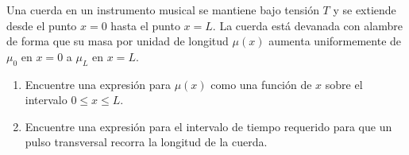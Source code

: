\item Una cuerda en un instrumento musical se mantiene bajo tensión $T$ y se extiende desde el punto $x = 0$ hasta el punto $x = L$. La cuerda está devanada con alambre de forma que su masa por unidad de longitud $\mu(x)$ aumenta uniformemente de $\mu_0$ en $x = 0$ a $\mu_L$ en $x = L$.
\begin{enumerate}
    \item Encuentre una expresión para $\mu(x)$ como una función de $x$ sobre el intervalo $0 \le x \le L$.
    \item Encuentre una expresión para el intervalo de tiempo requerido para que un pulso transversal recorra la longitud de la cuerda.
\end{enumerate}